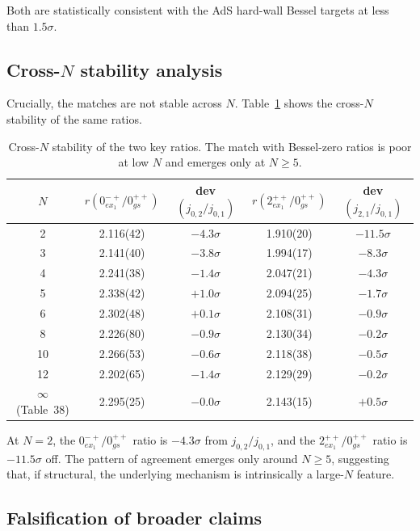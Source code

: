\documentclass[reprint,prd,amsmath,amssymb,nofootinbib,superscriptaddress]{revtex4-2}
\newcommand{\jbz}[2]{j_{#1,#2}}      %
\begin{document}
Both are statistically consistent with the AdS hard-wall Bessel targets at less than $1.5\sigma$.

\subsection{Cross-$N$ stability analysis}

Crucially, the matches are not stable across $N$. Table~\ref{tab:crossN} shows the cross-$N$ stability of the same ratios.

\begin{table}[ht]
  \caption{Cross-$N$ stability of the two key ratios. The match with Bessel-zero ratios is poor at low $N$ and emerges only at $N \geq 5$.}
  \label{tab:crossN}
  \begin{tabular}{c|cc|cc}
    \hline
    $N$ & $r(0^{-+}_{ex_1}/0^{++}_{gs})$ & dev$(\jbz{0}{2}/\jbz{0}{1})$ & $r(2^{++}_{ex_1}/0^{++}_{gs})$ & dev$(\jbz{2}{1}/\jbz{0}{1})$ \\
    \hline
    2 & 2.116(42) & $-4.3\sigma$ & 1.910(20) & $-11.5\sigma$ \\
    3 & 2.141(40) & $-3.8\sigma$ & 1.994(17) & $-8.3\sigma$ \\
    4 & 2.241(38) & $-1.4\sigma$ & 2.047(21) & $-4.3\sigma$ \\
    5 & 2.338(42) & $+1.0\sigma$ & 2.094(25) & $-1.7\sigma$ \\
    6 & 2.302(48) & $+0.1\sigma$ & 2.108(31) & $-0.9\sigma$ \\
    8 & 2.226(80) & $-0.9\sigma$ & 2.130(34) & $-0.2\sigma$ \\
    10 & 2.266(53) & $-0.6\sigma$ & 2.118(38) & $-0.5\sigma$ \\
    12 & 2.202(65) & $-1.4\sigma$ & 2.129(29) & $-0.2\sigma$ \\
    \hline
    $\infty$ (Table~38) & 2.295(25) & $-0.0\sigma$ & 2.143(15) & $+0.5\sigma$ \\
    \hline
  \end{tabular}
\end{table}

At $N=2$, the $0^{-+}_{ex_1}/0^{++}_{gs}$ ratio is $-4.3\sigma$ from $\jbz{0}{2}/\jbz{0}{1}$, and the $2^{++}_{ex_1}/0^{++}_{gs}$ ratio is $-11.5\sigma$ off. The pattern of agreement emerges only around $N \geq 5$, suggesting that, if structural, the underlying mechanism is intrinsically a large-$N$ feature.

\subsection{Falsification of broader claims}
\end{document}
